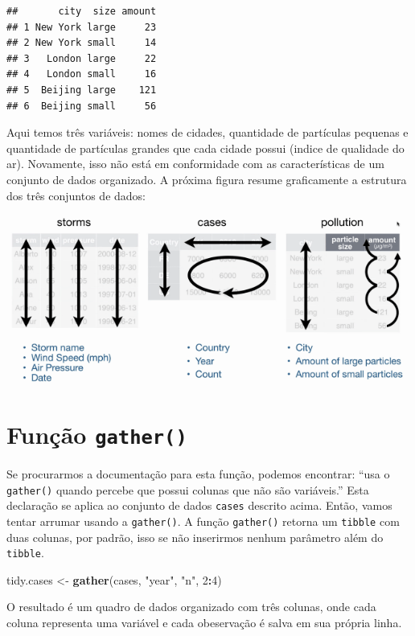 \documentclass[]{book}
\newenvironment{Shaded}{\begin{snugshade}}{\end{snugshade}}
\newcommand{\DecValTok}[1]{\textcolor[rgb]{0.00,0.00,0.81}{#1}}
\newcommand{\KeywordTok}[1]{\textcolor[rgb]{0.13,0.29,0.53}{\textbf{#1}}}
\newcommand{\NormalTok}[1]{#1}
\newcommand{\OperatorTok}[1]{\textcolor[rgb]{0.81,0.36,0.00}{\textbf{#1}}}
\newcommand{\StringTok}[1]{\textcolor[rgb]{0.31,0.60,0.02}{#1}}
\begin{document}
\begin{verbatim}
##       city  size amount
## 1 New York large     23
## 2 New York small     14
## 3   London large     22
## 4   London small     16
## 5  Beijing large    121
## 6  Beijing small     56
\end{verbatim}

Aqui temos três variáveis: nomes de cidades, quantidade de partículas pequenas e quantidade de partículas grandes que cada cidade possui (indice de qualidade do ar). Novamente, isso não está em conformidade com as características de um conjunto de dados organizado. A próxima figura resume graficamente a estrutura dos três conjuntos de dados:

\begin{center}\includegraphics[width=0.5\linewidth]{imagens/tidy_data} \end{center}

\hypertarget{funuxe7uxe3o-gather}{%
\section{\texorpdfstring{Função \texttt{gather()}}{Função gather()}}\label{funuxe7uxe3o-gather}}

Se procurarmos a documentação para esta função, podemos encontrar: ``usa o \texttt{gather()} quando percebe que possui colunas que não são variáveis.'' Esta declaração se aplica ao conjunto de dados \texttt{cases} descrito acima. Então, vamos tentar arrumar usando a \texttt{gather()}. A função \texttt{gather()} retorna um \texttt{tibble} com duas colunas, por padrão, isso se não inserirmos nenhum parâmetro além do \texttt{tibble}.

\begin{Shaded}
\begin{Highlighting}[]
\NormalTok{tidy.cases <-}\StringTok{ }\KeywordTok{gather}\NormalTok{(cases, }\StringTok{"year"}\NormalTok{, }\StringTok{"n"}\NormalTok{, }\DecValTok{2}\OperatorTok{:}\DecValTok{4}\NormalTok{)}
\end{Highlighting}
\end{Shaded}

O resultado é um quadro de dados organizado com três colunas, onde cada coluna representa uma variável e cada obeservação é salva em sua própria linha.
\end{document}
